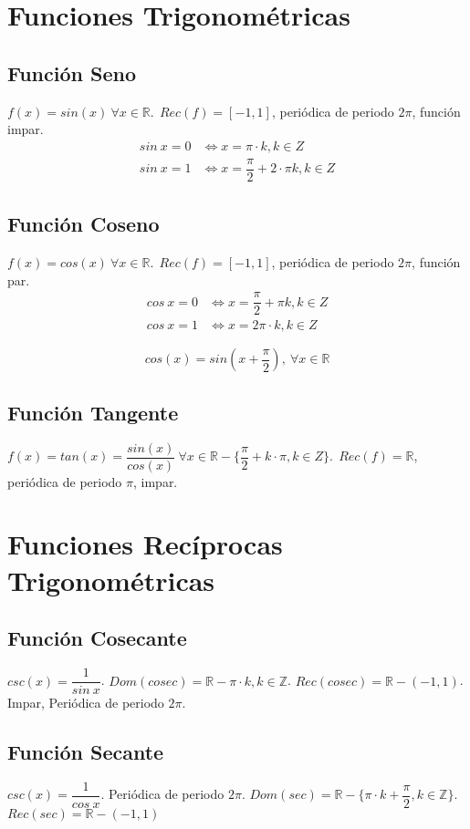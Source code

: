 \documentclass[11pt,a4paper]{article}
\begin{document}
\section{Funciones Trigonom\'etricas}
\subsection{Funci\'on Seno}
\noindent $f(x) = sin(x)\ \forall x \in \mathbb{R}.\ \ Rec(f) = [-1,1]$, peri\'odica de periodo $2\pi$, funci\'on impar.
\begin{align*}
sin\ x = 0 &\iff x = \pi \cdot k, k \in Z\\
sin\ x = 1 &\iff x = \dfrac{\pi}{2} + 2 \cdot \pi k, k \in Z
\end{align*}
\subsection{Funci\'on Coseno}
\noindent $f(x) = cos(x)\ \forall x \in \mathbb{R}.\ \ Rec(f) = [-1,1]$, peri\'odica de periodo $2\pi$, funci\'on par.
\begin{align*}
cos\ x = 0 &\iff x = \dfrac{\pi}{2} + \pi k, k \in Z\\
cos\ x = 1 &\iff x = 2\pi \cdot k, k \in Z
\end{align*}

$$cos(x) = sin\left(x+\dfrac{\pi}{2}\right),\ \forall x \in \mathbb{R}$$
\subsection{Funci\'on Tangente}
\noindent $f(x) = tan(x) = \dfrac{sin(x)}{cos(x)}\ \forall x \in \mathbb{R}-\{\dfrac{\pi}{2}+k\cdot \pi, k \in Z\}.\ \ Rec(f) = \mathbb{R}$, peri\'odica de periodo $\pi$, impar.

\section{Funciones Rec\'iprocas Trigonom\'etricas}
\subsection{Funci\'on Cosecante}
\noindent $csc(x) = \dfrac{1}{sin\ x}$. $Dom(cosec) = \mathbb{R} - \pi \cdot k, k \in \mathbb{Z}$. $Rec(cosec) = \mathbb{R} - (-1,1)$. \\ 

\noindent Impar, Peri\'odica de periodo $2\pi$.

\subsection{Funci\'on Secante}
\noindent $csc(x) = \dfrac{1}{cos\ x}$. Peri\'odica de periodo $2\pi$. $Dom(sec) = \mathbb{R} - \{ \pi \cdot k + \dfrac{\pi}{2}, k \in \mathbb{Z}\}$. $Rec(sec) = \mathbb{R} - (-1,1)$\\
\end{document}
